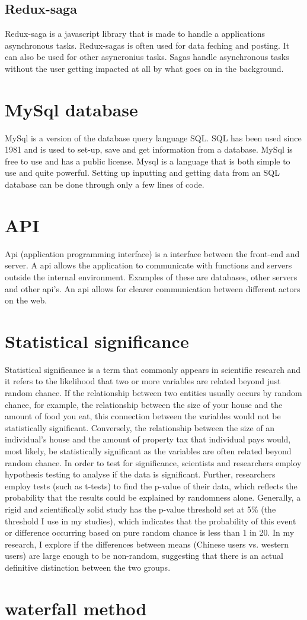 \subsection{Redux-saga}
Redux-saga is a javascript library that is made to handle a applications asynchronous tasks. Redux-sagas is often used for data feching and posting. It can also be used for other asyncronius tasks. Sagas handle asynchronous tasks without the user getting impacted at all by what goes on in the background. \cite{redux-saga}

\section{MySql database}
MySql is a version of the database query language SQL. SQL has been used since 1981 and is used to set-up, save and get information from a database. MySql is free to use and has a public license. Mysql is a language that is both simple to use and quite powerful. Setting up inputting and getting data from an SQL database can be done through only a  few lines of code.

\section{API}
Api (application programming interface) is a interface between the front-end and server. A api allows the application to communicate with functions and servers outside the internal environment. Examples of these are databases, other servers and other api's. An api allows for clearer communication between different actors on the web. 

\section{Statistical significance}
Statistical significance is a term that commonly appears in scientific research and it refers to the likelihood that two or more variables are related beyond just random chance. If the relationship between two entities usually occurs by random chance, for example, the relationship between the size of your house and the amount of food you eat, this connection between the variables would not be statistically significant. Conversely, the relationship between the size of an individual's house and the amount of property tax that individual pays would, most likely, be statistically significant as the variables are often related beyond random chance. In order to test for significance, scientists and researchers employ hypothesis testing to analyse if the data is significant. Further, researchers employ tests (such as t-tests) to find the p-value of their data, which reflects the probability that the results could be explained by randomness alone. Generally, a rigid and scientifically solid study has the p-value threshold set at 5\% (the threshold I use in my studies), which indicates that the probability of this event or difference occurring based on pure random chance is less than 1 in 20. In my research, I explore if the differences between means (Chinese users vs. western users) are large enough to be non-random, suggesting that there is an actual definitive distinction between the two groups. \cite{stats}

\section{waterfall method}



